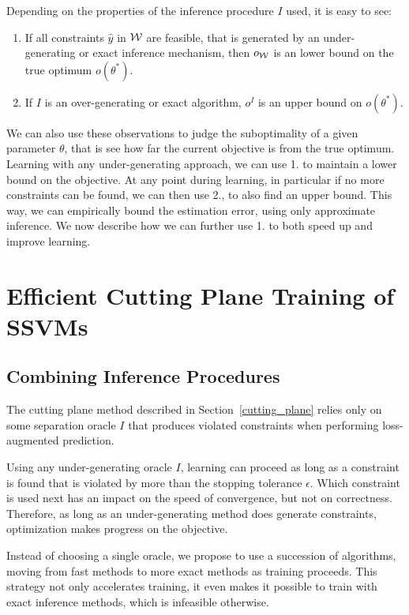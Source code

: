 Depending on the properties of the inference procedure $I$ used, it is easy to see:
\begin{enumerate}
    \item If all constraints $\hat{y}$ in  $\mathcal{W}$ are feasible, that is generated
        by an under-generating or exact inference mechanism, then $o_{\mathcal{W}}$ is
        an lower bound on the true optimum $o(\theta^*)$.

    \item If $I$ is an over-generating or exact algorithm, $o^I$ is an upper
        bound on $o(\theta^*)$.
\end{enumerate}

We can also use these observations to judge the suboptimality of a given
parameter $\theta$, that is see how far the current objective is from the true
optimum.  Learning with any under-generating approach, we can use 1. to
maintain a lower bound on the objective. At any point during learning, in
particular if no more constraints can be found, we can then use 2., to also
find an upper bound.  This way, we can empirically bound the estimation error,
using only approximate inference.  We now describe how we can further use 1. to
both speed up and improve learning.


\section{Efficient Cutting Plane Training of SSVMs}\label{learning}

\subsection{Combining Inference Procedures}\label{combining}
The cutting plane method described in Section~\ref{cutting_plane} relies only
on some separation oracle $I$ that produces violated constraints when
performing loss-augmented prediction.

Using any under-generating oracle $I$, learning can proceed as long as a
constraint is found that is violated by more than the stopping tolerance
$\epsilon$.  Which constraint is used next has an impact on the speed of
convergence, but not on correctness. Therefore, as long as an under-generating
method does generate constraints, optimization makes progress on the objective.

Instead of choosing a single oracle, we propose to use a succession of
algorithms, moving from fast methods to more exact methods as training
proceeds. This strategy not only accelerates training, it even makes it
possible to train with exact inference methods, which is infeasible otherwise.


